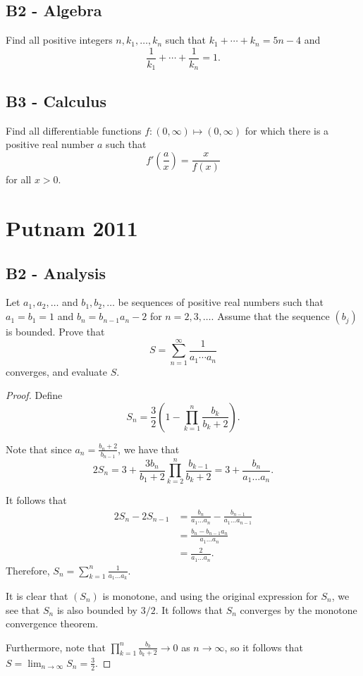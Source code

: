 \documentclass[11pt]{scrartcl}
\newcommand{\<}{\langle}
\renewcommand{\>}{\rangle}
\begin{document}
\subsection{B2 - Algebra}
Find all positive integers $n,k_1,\dots,k_n$ such that $k_1+\cdots+k_n=5n-4$ and
\[ \frac1{k_1}+\cdots+\frac1{k_n}=1. \]
\subsection{B3 - Calculus}
Find all differentiable functions $f: (0,\infty)\mapsto (0,\infty)$ for which there is a positive real number $a$ such that
\[ f'\left(\frac ax\right)=\frac x{f(x)} \]
for all $x>0.$
\pagebreak
\section{Putnam 2011}
\subsection{B2 - Analysis}
Let $a_1,a_2,\dots$ and $b_1,b_2,\dots$ be sequences of positive real numbers such that $a_1=b_1=1$ and $b_n=b_{n-1}a_n-2$ for $n=2,3,\dots.$ Assume that the sequence $(b_j)$ is bounded. Prove that\[S=\sum_{n=1}^{\infty}\frac1{a_1\cdots a_n}\]converges, and evaluate $S.$
\begin{proof}
Define
$$S_n = \frac{3}{2}\left (1 - \prod_{k=1}^n \frac{b_k}{b_{k }+ 2} \right).$$

Note that since $a_n = \frac{b_n + 2}{b_{n -1}}$, we have that 
$$2S_n = 3 + \frac{3b_n}{b_{1} + 2}\prod_{k=2}^{n} \frac{b_{k-1}}{b_{k} + 2} = 3 + \frac{b_n}{a_1\dots a_n}.$$

It follows that 
\begin{align*}
2S_n - 2S_{n-1} &= \frac{b_n}{a_1 \dots a_n} - \frac{b_{n-1}}{a_1 \dots a_{n-1}} \\
&= \frac{b_n - b_{n-1}a_n}{a_1 \dots a_n} \\
&= \frac{2}{a_1 \dots a_n}.
\end{align*}
Therefore, $S_n = \sum_{k=1}^n \frac{1}{a_1 \dots a_k}$.

It is clear that $(S_n)$ is monotone, and using the original expression for $S_n$, we see that $S_n$ is also bounded by $3/2$.  It follows that $S_n$ converges by the monotone convergence theorem.

Furthermore, note that $\prod_{k=1}^n \frac{b_k}{b_{k} + 2} \to 0$ as $n \to \infty$, so it follows that $S = \lim_{n \to \infty} S_n = \frac{3}{2}$.
\end{proof}
\end{document}
